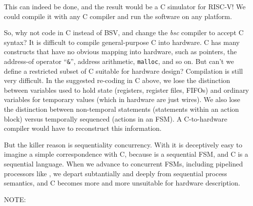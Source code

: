 This can indeed be done, and the result would be a C simulator for
RISC-V!  We could compile it with any C compiler and run the software
on any platform.

So, why not code {\DRUM} in C instead of BSV, and change the \emph{bsc}
compiler to accept C syntax?  It is difficult to compile
general-purpose C into hardware.  C has many constructs that have no
obvious mapping into hardware, such as pointers, the address-of
operator ``\verb|&|'', address arithmetic, \verb|malloc|, and so on.
But can't we define a restricted subset of C suitable for hardware
design?  Compilation is still very difficult.  In the suggested
re-coding in C above, we lose the distinction between variables used
to hold state (registers, register files, FIFOs) and ordinary
variables for temporary values (which in hardware are just wires).  We
also lose the distinction between non-temporal statements (statements
within an action block) versus temporally sequenced (actions in an
FSM).  A C-to-hardware compiler would have to reconstruct this
information.

But the killer reason is sequentiality {\vs} concurrency.  With {\DRUM}
it is deceptively easy to imagine a simple correspondence with C,
because {\DRUM} is a sequential FSM, and C is a sequential language.
When we advance to concurrent FSMs, including pipelined processors
like {\FIFE}, we depart subtantially and deeply from sequential process
semantics, and C becomes more and more unsuitable for hardware
description.

\vspace{2ex}

NOTE: 


